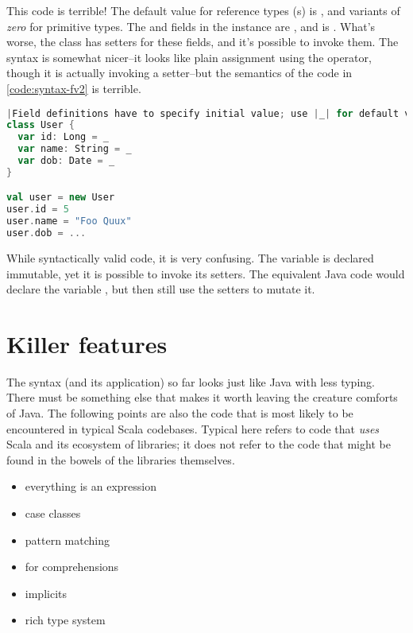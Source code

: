 \documentclass[10 pt]{article}
\begin{document}
This code is terrible! The default value for reference types (s) is , and variants of \emph{zero} for primitive types. The  and  fields in the  instance are , and  is . What's worse, the class has setters for these fields, and it's possible to invoke them. The syntax is somewhat nicer--it looks like plain assignment using the \pcode{=} operator, though it is actually invoking a setter--but the semantics of the code in \autoref{code:syntax-fv2} is terrible.

\begin{lstlisting}[caption={Fields \& variables II}, label={code:syntax-fv2}, language=Scala, escapechar=|]
|Field definitions have to specify initial value; use |_| for default value.|
class User {
  var id: Long = _
  var name: String = _
  var dob: Date = _
}

val user = new User
user.id = 5
user.name = "Foo Quux"
user.dob = ...
\end{lstlisting}

While syntactically valid code, it is very confusing. The  variable is declared immutable, yet it is possible to invoke its setters. The equivalent Java code would declare the  variable , but then still use the setters to mutate it.

\section{Killer features}
The syntax (and its application) so far looks just like Java with less typing. There must be something else that makes it worth leaving the creature comforts of Java. The following points are also the code that is most likely to be encountered in typical Scala codebases. Typical here refers to code that \emph{uses} Scala and its ecosystem of libraries; it does not refer to the code that might be found in the bowels of the libraries themselves.

\begin{itemize}
  \item everything is an expression
  \item case classes
  \item pattern matching
  \item for comprehensions
  \item implicits
  \item rich type system
\end{itemize}
\end{document}
